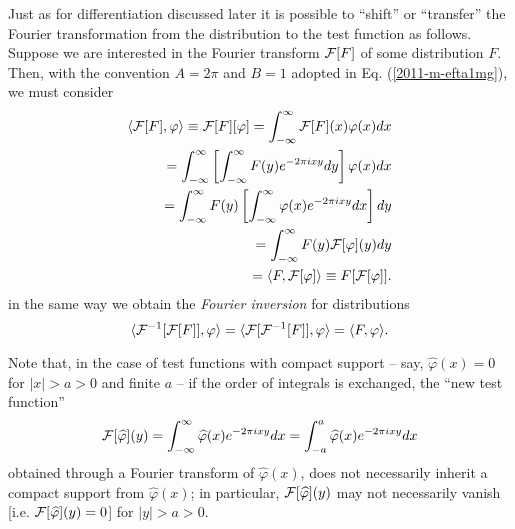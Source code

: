 Just as for differentiation discussed later it is possible to ``shift'' or ``transfer'' the
Fourier transformation from the distribution to the test function
as follows.
Suppose we are interested in the Fourier transform ${\cal F}[F]$ of some distribution $F$.
Then, with the convention
 $A=2\pi $ and $B=1$  adopted in Eq. (\ref{2011-m-efta1mg}), we must consider
\begin{equation}
\begin{split}
\langle  {\cal F}[F ], \varphi \rangle \equiv {\cal F}[F ][\varphi ]
=
\int_{-\infty}^\infty {\cal F}[F](x) \varphi (x) dx
\\ \qquad =
\int_{-\infty}^\infty \left[ \int_{-\infty}^\infty F(y) e^{- 2\pi ixy} dy \right] \varphi (x) dx
\\ \qquad =
\int_{-\infty}^\infty  F(y)  \left[ \int_{-\infty}^\infty \varphi (x) e^{- 2\pi ixy}  dx \right] dy
\\ \qquad =
\int_{-\infty}^\infty  F(y)  {\cal F}[ \varphi ](y) dy
\\ \qquad =
\langle  F , {\cal F}[\varphi ]\rangle \equiv F [{\cal F}[\varphi ]]
.
\end{split}
\end{equation}
in the same way we obtain the
{\em Fourier inversion}
for distributions
\begin{equation}
\langle   {\cal F}^{-1}[{\cal F}[F ]], \varphi \rangle
=
\langle   {\cal F}[{\cal F}^{-1}[F ]], \varphi \rangle
=
\langle    F  , \varphi \rangle
.
\end{equation}

Note that, in the case of test functions with compact support -- say, $\widehat{\varphi} (x) = 0$ for $\vert x \vert > a > 0$ and finite $a$
--  if the order of integrals is exchanged, the ``new test function''
\begin{equation}
{\cal F}[ \widehat{\varphi}] (y)=
\int_{-\infty}^\infty  \widehat{\varphi} (x) e^{- 2\pi ixy}  dx
=
\int_{-a}^a  \widehat{\varphi} (x) e^{- 2\pi ixy}  dx
\end{equation}
obtained through a Fourier transform of  $\widehat{\varphi} (x)$,
does not necessarily inherit a compact support  from $\widehat{\varphi} (x)$;
in particular,
${\cal F}[ \widehat{\varphi}] (y)$
may not necessarily vanish [i.e.  ${\cal F}[ \widehat{\varphi}] (y) = 0$] for $\vert y \vert > a > 0$.


